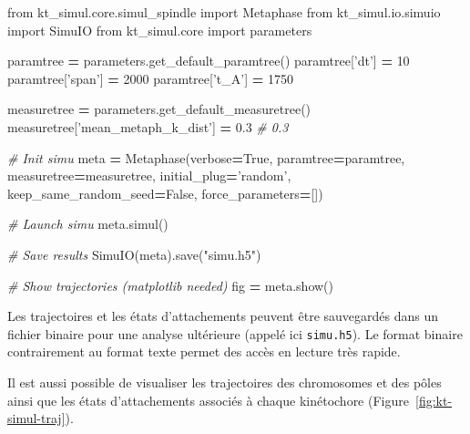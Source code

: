 \documentclass[12pt,a4paper,twoside,openright]{book}
\newenvironment{Shaded}{\begin{snugshade}}{\end{snugshade}}
\newcommand{\DecValTok}[1]{\textcolor[rgb]{0.00,0.00,0.81}{{#1}}}
\newcommand{\FloatTok}[1]{\textcolor[rgb]{0.00,0.00,0.81}{{#1}}}
\newcommand{\StringTok}[1]{\textcolor[rgb]{0.31,0.60,0.02}{{#1}}}
\newcommand{\ImportTok}[1]{{#1}}
\newcommand{\CommentTok}[1]{\textcolor[rgb]{0.56,0.35,0.01}{\textit{{#1}}}}
\newcommand{\VariableTok}[1]{\textcolor[rgb]{0.00,0.00,0.00}{{#1}}}
\newcommand{\OperatorTok}[1]{\textcolor[rgb]{0.81,0.36,0.00}{\textbf{{#1}}}}
\newcommand{\NormalTok}[1]{{#1}}
\begin{document}
\begin{Shaded}
\begin{Highlighting}[]
\ImportTok{from} \NormalTok{kt_simul.core.simul_spindle }\ImportTok{import} \NormalTok{Metaphase}
\ImportTok{from} \NormalTok{kt_simul.io.simuio }\ImportTok{import} \NormalTok{SimuIO}
\ImportTok{from} \NormalTok{kt_simul.core }\ImportTok{import} \NormalTok{parameters}

\NormalTok{paramtree }\OperatorTok{=} \NormalTok{parameters.get_default_paramtree()}
\NormalTok{paramtree[}\StringTok{'dt'}\NormalTok{] }\OperatorTok{=} \DecValTok{10}
\NormalTok{paramtree[}\StringTok{'span'}\NormalTok{] }\OperatorTok{=} \DecValTok{2000}
\NormalTok{paramtree[}\StringTok{'t_A'}\NormalTok{] }\OperatorTok{=} \DecValTok{1750}

\NormalTok{measuretree }\OperatorTok{=} \NormalTok{parameters.get_default_measuretree()}
\NormalTok{measuretree[}\StringTok{'mean_metaph_k_dist'}\NormalTok{] }\OperatorTok{=} \FloatTok{0.3}  \CommentTok{# 0.3}

\CommentTok{# Init simu}
\NormalTok{meta }\OperatorTok{=} \NormalTok{Metaphase(verbose}\OperatorTok{=}\VariableTok{True}\NormalTok{,}
                 \NormalTok{paramtree}\OperatorTok{=}\NormalTok{paramtree,}
                 \NormalTok{measuretree}\OperatorTok{=}\NormalTok{measuretree,}
                 \NormalTok{initial_plug}\OperatorTok{=}\StringTok{'random'}\NormalTok{,}
                 \NormalTok{keep_same_random_seed}\OperatorTok{=}\VariableTok{False}\NormalTok{,}
                 \NormalTok{force_parameters}\OperatorTok{=}\NormalTok{[])}

\CommentTok{# Launch simu}
\NormalTok{meta.simul()}

\CommentTok{# Save results}
\NormalTok{SimuIO(meta).save(}\StringTok{"simu.h5"}\NormalTok{)}

\CommentTok{# Show trajectories (matplotlib needed)}
\NormalTok{fig }\OperatorTok{=} \NormalTok{meta.show()}
\end{Highlighting}
\end{Shaded}

Les trajectoires et les états d'attachements peuvent être sauvegardés
dans un fichier binaire pour une analyse ultérieure (appelé ici
\texttt{simu.h5}). Le format binaire contrairement au format texte
permet des accès en lecture très rapide.

Il est aussi possible de visualiser les trajectoires des chromosomes et
des pôles ainsi que les états d'attachements associés à chaque
kinétochore (Figure~\ref{fig:kt-simul-traj}).
\end{document}
